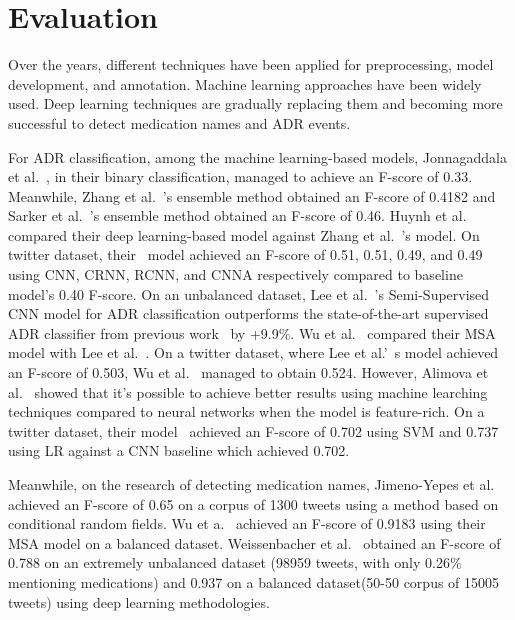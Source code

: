 \section{Evaluation}

Over the years, different techniques have been applied for preprocessing, model development, and annotation. Machine learning approaches have been widely used. Deep learning techniques are gradually replacing them and becoming more successful to detect medication names and ADR events.

For ADR classification, among the machine learning-based models, Jonnagaddala et al.~\cite{jonnagaddala2016binary}, in their binary classification, managed to achieve an F-score of 0.33. Meanwhile, Zhang et al.~\cite{zhang2016ensemble}'s ensemble method obtained an F-score of 0.4182 and Sarker et al.~\cite{sarker2016social}'s ensemble method obtained an F-score of 0.46.  Huynh et al.~\cite{huynh2016adverse} compared their deep learning-based model against Zhang et al.~\cite{zhang2016ensemble}’s model. On twitter dataset, their~\cite{huynh2016adverse} model achieved an F-score of 0.51, 0.51, 0.49, and 0.49 using CNN, CRNN, RCNN, and CNNA respectively compared to baseline model's 0.40 F-score. On an unbalanced dataset, Lee et al.~\cite{lee2017adverse}'s Semi-Supervised CNN model for ADR classification outperforms the state-of-the-art supervised ADR classifier from previous work~\cite{sarker2015portable} by +9.9\%. Wu et al.~\cite{wu2019msa} compared their MSA model with Lee et al.~\cite{lee2017adverse}. On a twitter dataset, where Lee et al.'~\cite{lee2017adverse}s model achieved an F-score of 0.503, Wu et al.~\cite{wu2019msa} managed to obtain 0.524. However, Alimova et al.~\cite{alimova2017automated} showed that it's possible to achieve better results using machine learching techniques compared to neural networks when the model is feature-rich. On a twitter dataset, their model~\cite{alimova2017automated} achieved an F-score of 0.702 using SVM and 0.737 using LR against a CNN baseline which achieved 0.702.

Meanwhile, on the research of detecting medication names, Jimeno-Yepes et al.~\cite{jimeno2015identifying} achieved an F-score of 0.65 on a corpus of 1300 tweets using a method based on conditional random fields. Wu et a.~\cite{wu2018detecting} achieved an F-score of 0.9183 using their MSA model on a balanced dataset. Weissenbacher et al.~\cite{weissenbacher2019deep} obtained an F-score of 0.788 on an extremely unbalanced dataset (98959 tweets, with only 0.26\% mentioning medications) and 0.937 on a balanced dataset(50-50 corpus of 15005 tweets) using deep learning methodologies.